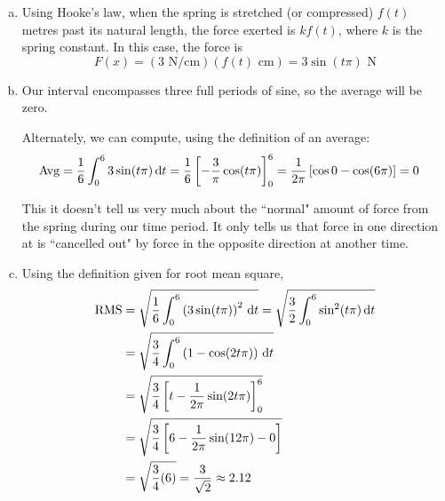 \begin{solution}
\begin{enumerate}[(a)]
\item Using Hooke's law, when the spring is stretched (or compressed) $f(t)$ metres past its natural length, the force exerted is $kf(t)$, where $k$ is the spring constant. In this case, the force is
\[F(x) = (3\text{ N/cm})(f(t)\text{ cm}) = 3 \sin\left(t\pi\right)\text{ N}\]
\item Our interval encompasses three full periods of sine, so the  average will be zero.

Alternately, we can compute, using the definition of an average:
\begin{align*}
\text{Avg}&=\frac{1}{6}\int_0^6 3\sin(t\pi)\,\mathrm{d}t= \frac{1}{6}\left[-\frac{3}{\pi}\cos(t\pi)\right]_0^6=\frac{1}{2\pi}\left[\cos 0 - \cos (6\pi)\right]=0
\end{align*}

This it doesn't tell us very much about the ``normal" amount of force from the spring during our time period. It only tells us that force in one direction at is ``cancelled out" by force in the opposite direction at another time.
\item Using the definition given for root  mean square,
\begin{align*}
\text{RMS}&=\sqrt{\frac{1}{6}\int_0^6 \left(3\sin(t\pi)\right)^2\,\mathrm{d}t} = \sqrt{\frac{3}{2}\int_0^6 \sin^2(t\pi)\,\mathrm{d}t}\\& = \sqrt{\frac{3}{4}\int_0^6 \left(1-\cos(2t\pi)\right)\,\mathrm{d}t}\\
&=\sqrt{\frac{3}{4}\left[t - \frac{1}{2\pi}\sin(2t\pi)\right]_0^6}\\
&=\sqrt{\frac{3}{4}\left[6 - \frac{1}{2\pi}\sin(12\pi)-0\right]}
\\&=\sqrt{\frac{3}{4}(6)}=\frac{3}{\sqrt2}\approx 2.12
\end{align*}
\end{enumerate}
\end{solution}




\subsection*{\Application}


